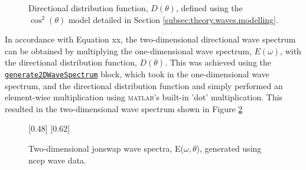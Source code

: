                     



\begin{figure}[H]
    \centering
    \resizebox{0.48\linewidth}{!}{}
    \caption{Directional distribution function, $D(\theta)$, defined using the $\cos^2(\theta)$ model detailed in Section \ref{subsec:theory.waves.modelling}.}
    \label{fig:systemDesign.direcDistributionFunction}
\end{figure}

In accordance with Equation xx, the two-dimensional directional wave spectrum can be obtained by multiplying the one-dimensional wave spectrum, $E(\omega)$, with the directional distribution function, $D(\theta)$. This was achieved using the \href{https://github.com/JNSRYA006/sar-parameter-extraction-pipeline/blob/main/functions/waveSpectra/generate2DWaveSpectrum.m}{\lstinline{generate2DWaveSpectrum}} block, which took in the one-dimensional wave spectrum, and the directional distribution function and simply performed an element-wise multiplication using \textsc{matlab}'s built-in 'dot' multiplication. This resulted in the two-dimensional wave spectrum shown in Figure \ref{fig:systemDesign.2DSampleWaveSpectrum}
\begin{figure} [H]
    \centering
    [0.48\linewidth]{
        \resizebox{\linewidth}{!}{}
    }
    [0.62\linewidth]{
        \resizebox{\linewidth}{!}{}
    }
    \caption{Two-dimensional \acs{jonswap} wave spectra, E($\omega,\theta$), generated using \acs{ncep} wave data.}
    \label{fig:systemDesign.2DSampleWaveSpectrum}
\end{figure}


